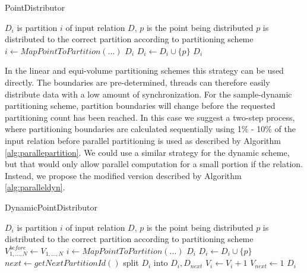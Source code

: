 \documentclass[12pt,a4paper,twoside]{report}
\begin{document}
\begin{algorithm}[H]
	\caption{PointDistributor}
	\label{alg:parallepartition}
	\begin{algorithmic}
		\Require $D_i$ is partition $i$ of input relation $D$,
			$p$ is the point being distributed
		\Ensure $p$ is distributed to the correct partition according
		to partitioning scheme
   		\State $i \leftarrow MapPointToPartition(\ldots)$
   		\State \Lock $D_i$
   		\State $D_i \leftarrow D_i \cup \{p\}$
   		\State \Unlock $D_i$
   \end{algorithmic}
\end{algorithm}

In the linear and equi-volume partitioning schemes this strategy
can be used directly. The boundaries are pre-determined, threads
can therefore easily distribute data with a low amount of
synchronization. For the sample-dynamic partitioning scheme,
partition boundaries will change before the requested partitioning
count has been reached. In this case we suggest a two-step
process, where partitioning boundaries are calculated sequentially
using 1\% - 10\% of the input relation before parallel
partitioning is used as described by Algorithm
\ref{alg:parallepartition}. We could use a similar strategy for
the dynamic scheme, but that would only allow parallel computation
for a small portion if the relation. Instead, we propose the modified
version described by Algorithm \ref{alg:paralleldyn}.

\begin{algorithm}[H]
	\caption{DynamicPointDistributor}
	\label{alg:paralleldyn}
	\begin{algorithmic}
		\Require $D_i$ is partition $i$ of input relation $D$,
			$p$ is the point being distributed
		\Ensure $p$ is distributed to the correct partition according
		to partitioning scheme
		\State $V_{1,\ldots,N}^{before} \leftarrow V_{1,\ldots,N}$
   		\State $i \leftarrow MapPointToPartition(\ldots)$
   		\State \Lock $D_i$
   			\State $D_i \leftarrow D_i \cup \{p\}$
   				\State $next \leftarrow getNextPartitionId()$
   				\State split $D_i$ into $D_i, D_{next}$
   				\State $V_i \leftarrow V_i + 1$
   				\State $V_{next} \leftarrow 1$
   			\EndIf
   		\EndIf
   		\State \Unlock $D_i$
   \end{algorithmic}
\end{algorithm}
\end{document}
